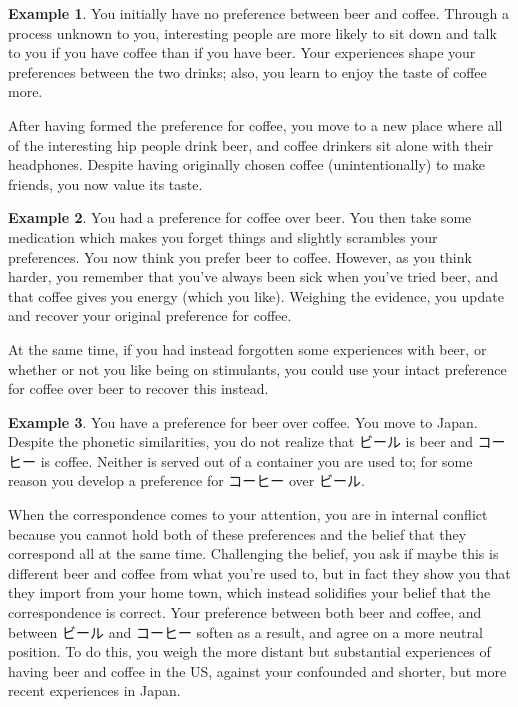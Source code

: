 \documentclass{article}
\theoremstyle{plain}
\theoremstyle{definition}
\newtheorem{example}{Example}[section]
\theoremstyle{remark}
\begin{document}
	\begin{example}
		You initially have no preference between beer and coffee. Through a process unknown to you, interesting people are more likely to sit down and talk to you if you have coffee than if you have beer. Your experiences shape your preferences between the two drinks; also, you learn to enjoy the taste of coffee more.
		
		After having formed the preference for coffee, you move to a new place where all of the interesting hip people drink beer, and coffee drinkers sit alone with their headphones. Despite having originally chosen coffee (unintentionally) to make friends, you now value its taste. 
	\end{example}

	\begin{example}
		You had a preference for coffee over beer. You then take some medication which makes you forget things and slightly scrambles your preferences. You now think you prefer beer to coffee. However, as you think harder, you remember that you've always been sick when you've tried beer, and that coffee gives you energy (which you like). Weighing the evidence, you  update and recover your original preference for coffee.
		
		At the same time, if you had instead forgotten some experiences with beer, or whether or not you like being on stimulants, you could use your intact preference for coffee over beer to recover this instead.
	\end{example}

	\begin{example}
		You have a preference for beer over coffee. You move to Japan. Despite the phonetic similarities, you do not realize that ビール is beer and コーヒー is coffee. Neither is served out of a container you are used to; for some reason you develop a preference for コーヒー over ビール. 
		
		When the correspondence comes to your attention, you are in internal conflict because you cannot hold both of these preferences and the belief that they correspond all at the same time. Challenging the belief, you ask if maybe this is different beer and coffee from what you're used to, but in fact they show you that they import from your home town, which instead solidifies your belief that the correspondence is correct. Your preference between both beer and coffee, and between ビール and コーヒー soften as a result, and agree on a more neutral position. To do this, you weigh the more distant but substantial experiences of having beer and coffee in the US, against your confounded and shorter, but more recent experiences in Japan.
	\end{example}
\end{document}
